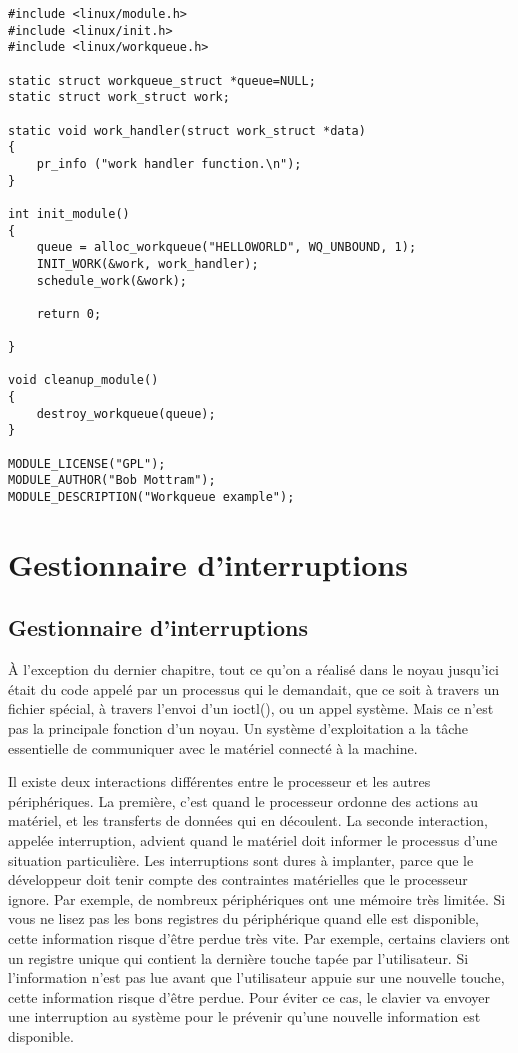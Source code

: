 \documentclass[11pt]{article}
\begin{document}
\begin{verbatim}
#include <linux/module.h>
#include <linux/init.h>
#include <linux/workqueue.h>

static struct workqueue_struct *queue=NULL;
static struct work_struct work;

static void work_handler(struct work_struct *data)
{
    pr_info ("work handler function.\n");
}

int init_module()
{
    queue = alloc_workqueue("HELLOWORLD", WQ_UNBOUND, 1);
    INIT_WORK(&work, work_handler);
    schedule_work(&work);

    return 0;

}

void cleanup_module()
{
    destroy_workqueue(queue);
}

MODULE_LICENSE("GPL");
MODULE_AUTHOR("Bob Mottram");
MODULE_DESCRIPTION("Workqueue example");
\end{verbatim}

\section*{Gestionnaire d'interruptions}
\label{sec-15}

\subsection*{Gestionnaire d'interruptions}
\label{sec-15-1}
À l'exception du dernier chapitre, tout ce qu'on a réalisé dans le noyau jusqu'ici était du code appelé par un processus qui le demandait, que ce soit à travers un fichier spécial, à travers l'envoi d'un ioctl(), ou un appel système. Mais ce n'est pas la principale fonction d'un noyau. Un système d'exploitation a la tâche essentielle de communiquer avec le matériel connecté à la machine.

Il existe deux interactions différentes entre le processeur et les autres périphériques. La première, c'est quand le processeur ordonne des actions au matériel, et les transferts de données qui en découlent. La seconde interaction, appelée interruption, advient quand le matériel doit informer le processus d'une situation particulière. Les interruptions sont dures à implanter, parce que le développeur doit tenir compte des contraintes matérielles que le processeur ignore. Par exemple, de nombreux périphériques ont une mémoire très limitée. Si vous ne lisez pas les bons registres du périphérique quand elle est disponible, cette information risque d'être perdue très vite. Par exemple, certains claviers ont un registre unique qui contient la dernière touche tapée par l'utilisateur. Si l'information n'est pas lue avant que l'utilisateur appuie sur une nouvelle touche, cette information risque d'être perdue. Pour éviter ce cas, le clavier va envoyer une interruption au système pour le prévenir qu'une nouvelle information est disponible.
\end{document}
